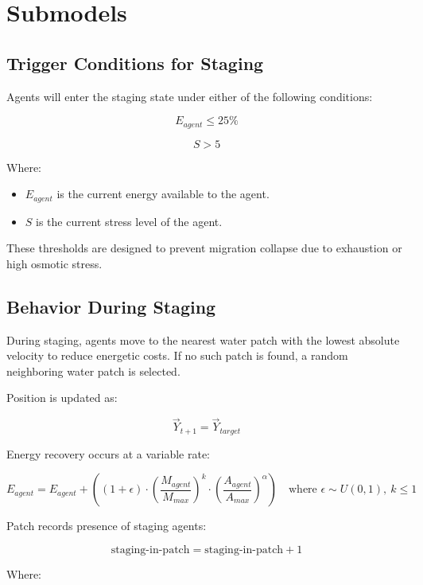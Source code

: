 \documentclass[
]{book}
\begin{document}
\section{Submodels}\label{submodels-6}

\subsection{Trigger Conditions for Staging}\label{trigger-conditions-for-staging}

Agents will enter the staging state under either of the following conditions:

\[
E_{agent} \leq 25 \%
\]

\[
S > 5
\]

Where:

\begin{itemize}
\item
  \(E_{agent}\) is the current energy available to the agent.
\item
  \(S\) is the current stress level of the agent.
\end{itemize}

These thresholds are designed to prevent migration collapse due to exhaustion or high osmotic stress.

\subsection{Behavior During Staging}\label{behavior-during-staging}

During staging, agents move to the nearest water patch with the lowest absolute velocity to reduce energetic costs. If no such patch is found, a random neighboring water patch is selected.

Position is updated as:

\[
\vec{Y}_{t+1} = \vec{Y}_{target}
\]

Energy recovery occurs at a variable rate:

\[
E_{agent} = E_{agent} + \left((1 + \epsilon) \cdot \left( \frac{M_{agent}}{M_{max}} \right)^k \cdot \left( \frac{A_{agent}}{A_{max}} \right)^\alpha \right) \quad \text{where } \epsilon \sim U(0,1),\ k \leq 1
\]

Patch records presence of staging agents:

\[
\text{staging-in-patch} = \text{staging-in-patch} + 1
\]

Where:
\end{document}
